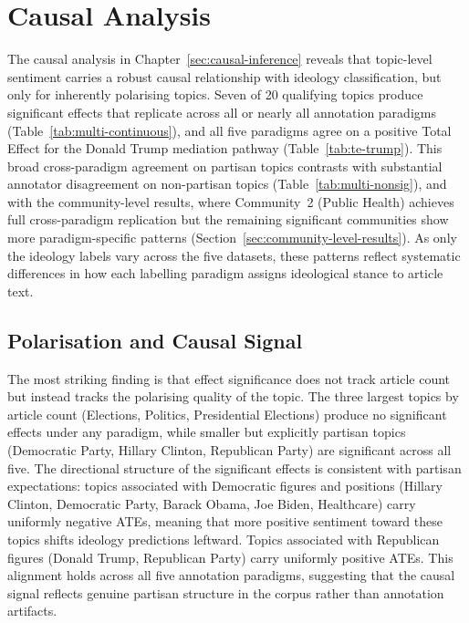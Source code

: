 \section{Causal Analysis}
\label{sec:causal-discussion}

The causal analysis in Chapter~\ref{sec:causal-inference} reveals that topic-level sentiment carries a robust causal relationship with ideology classification, but only for inherently polarising topics. Seven of 20 qualifying topics produce significant effects that replicate across all or nearly all annotation paradigms (Table~\ref{tab:multi-continuous}), and all five paradigms agree on a positive Total Effect for the Donald Trump mediation pathway (Table~\ref{tab:te-trump}). This broad cross-paradigm agreement on partisan topics contrasts with substantial annotator disagreement on non-partisan topics (Table~\ref{tab:multi-nonsig}), and with the community-level results, where Community~2 (Public Health) achieves full cross-paradigm replication but the remaining significant communities show more paradigm-specific patterns (Section~\ref{sec:community-level-results}). As only the ideology labels vary across the five datasets, these patterns reflect systematic differences in how each labelling paradigm assigns ideological stance to article text.

\subsection{Polarisation and Causal Signal}

The most striking finding is that effect significance does not track article count but instead tracks the polarising quality of the topic. The three largest topics by article count (Elections, Politics, Presidential Elections) produce no significant effects under any paradigm, while smaller but explicitly partisan topics (Democratic Party, Hillary Clinton, Republican Party) are significant across all five. The directional structure of the significant effects is consistent with partisan expectations: topics associated with Democratic figures and positions (Hillary Clinton, Democratic Party, Barack Obama, Joe Biden, Healthcare) carry uniformly negative ATEs, meaning that more positive sentiment toward these topics shifts ideology predictions leftward. Topics associated with Republican figures (Donald Trump, Republican Party) carry uniformly positive ATEs. This alignment holds across all five annotation paradigms, suggesting that the causal signal reflects genuine partisan structure in the corpus rather than annotation artifacts.

